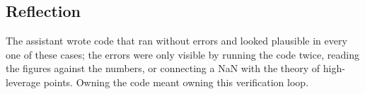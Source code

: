 \subsection*{Reflection}

The assistant wrote code that ran without errors and looked plausible in every one of these cases; the
errors were only visible by running the code twice, reading the figures against the numbers, or
connecting a NaN with the theory of high-leverage points. Owning the code meant owning this
verification loop.

